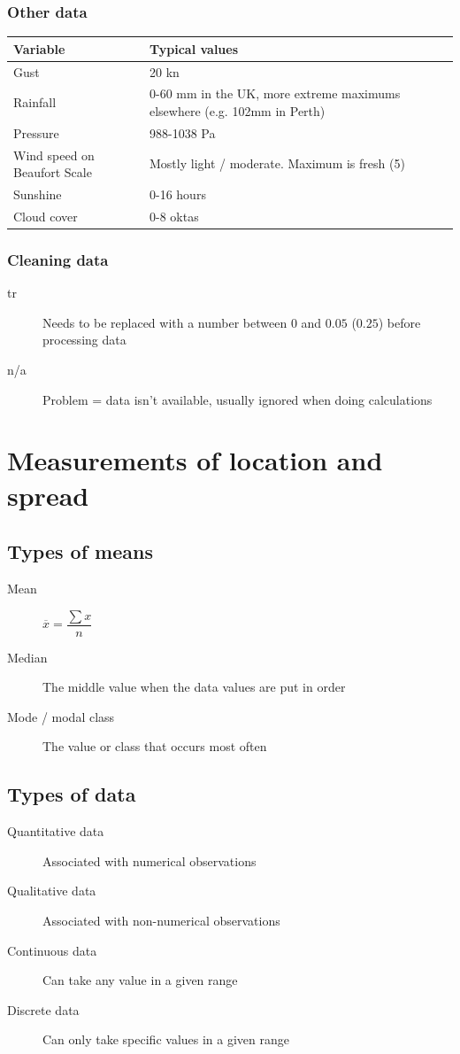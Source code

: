 \documentclass[fleqn, 11pt]{article}
\begin{document}
	\subsubsection*{Other data}
	\begin{tabular}{|p{4.8cm} | p{12.2cm}|}
		\hline
		\textbf{Variable} & \textbf{Typical values} \\
		\hline
		Gust & 20 kn \\
		\hline
		Rainfall & 0-60 mm in the UK, more extreme maximums elsewhere (e.g. 102mm in Perth) \\
		\hline
		Pressure & 988-1038 Pa \\
		\hline
		Wind speed on Beaufort Scale & Mostly light / moderate. Maximum is fresh (5) \\
		\hline
		Sunshine & 0-16 hours \\
		\hline
		Cloud cover & 0-8 oktas \\
		\hline
	\end{tabular}
	
	\subsubsection{Cleaning data}
	\begin{description}
		\item[tr] Needs to be replaced with a number between $0$ and $0.05$ ($0.25$) before processing data
		\item[n/a] Problem = data isn't available, usually ignored when doing calculations
	\end{description}
	
	\pagebreak
	
	
	\section{Measurements of location and spread}
	\subsection{Types of means}
	\begin{description}
		\item[Mean] $\overline{x}=\dfrac{\sum x}{n}$
		\item[Median] The middle value when the data values are put in order
		\item[Mode / modal class] The value or class that occurs most often
	\end{description}
	
	\subsection{Types of data}
	\begin{description}
		\item[Quantitative data] Associated with numerical observations
		\item[Qualitative data] Associated with non-numerical observations
		\item[Continuous data] Can take any value in a given range
		\item[Discrete data] Can only take specific values in a given range
	\end{description}
	
\end{document}
